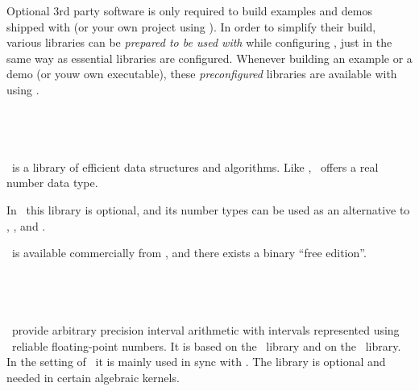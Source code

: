 Optional 3rd party software is only required to build examples and
demos shipped with \cgal (or your own project using \cgal). In order
to simplify their build, various libraries can be \emph{prepared to be
used with \cgal} while configuring \cgal, just in the same way as
essential libraries are configured. Whenever building an example or a
demo (or youw own executable), these \emph{preconfigured} libraries
are available with using \cgal. 


%
%
%


\subsection{\leda\ \label{thirdparty:Leda}}

\leda\ is a library of efficient data structures and
algorithms. Like \core, \leda\ offers a real number data type.  

In \cgal\ this library is optional, and its number types can 
be used as an alternative to \gmp, \mpfr, and \core.

\leda\ is available commercially from \ledapage,
and there exists a binary ``free edition''.

\subsection{\mpfi\ \label{thirdparty:MPFI}}

\mpfi\ provide arbitrary precision interval arithmetic with intervals 
represented using \mpfr\ reliable floating-point numbers. 
It is based on the \gmp\ library and on the \mpfr\ library.
In the setting of \cgal\ it is mainly used in sync with \rs. 
The library is optional and needed in certain algebraic
kernels.

